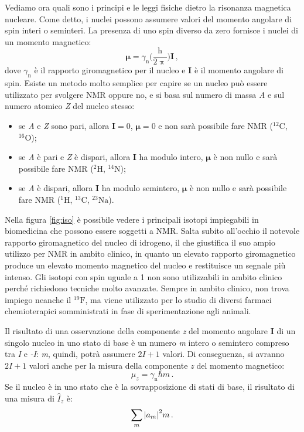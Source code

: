 \documentclass{report}
\newcommand{\figref}[1]{figura \ref{#1}}
\numberwithin{equation}{section}
\numberwithin{figure}{section}
\renewcommand{\Vec}{\bm}
\begin{document}
Vediamo ora quali sono i principi e le leggi fisiche dietro la risonanza magnetica nucleare. Come detto, i nuclei possono assumere valori del momento angolare di spin interi o seminteri. La presenza di uno spin diverso da zero fornisce i nuclei di un momento magnetico:
\begin{equation}
    \Vec{\mu} = \gamma_\mathrm{n} \bigg( \frac{\mathrm{h}}{2\uppi} \bigg) \Vec{I}\,,
\end{equation}
dove $\gamma_\mathrm{n}$ è il rapporto giromagnetico per il nucleo e $\Vec{I}$ è il momento angolare di spin. Esiste un metodo molto semplice per capire se un nucleo può essere utilizzato per svolgere NMR oppure no, e si basa sul numero di massa \textit{A} e sul numero atomico \textit{Z} del nucleo stesso:
\begin{itemize}[label=$-$]
    \item se \textit{A} e \textit{Z} sono pari, allora $\Vec{I}=0$, $\Vec{\mu}=0$ e non sarà possibile fare NMR ($\mathrm{^{12}C}$, $\mathrm{^{16}O}$);
    \item se \textit{A} è pari e \textit{Z} è dispari, allora $\Vec{I}$ ha modulo intero, $\Vec{\mu}$ è non nullo e sarà possibile fare NMR ($\mathrm{^2H}$, $\mathrm{^{14}N}$);
    \item se \textit{A} è dispari, allora $\Vec{I}$ ha modulo semintero, $\Vec{\mu}$ è non nullo e sarà possibile fare NMR ($\mathrm{^1H}$, $\mathrm{^{13}C}$, $\mathrm{^{23}Na}$).
\end{itemize}
Nella \figref{fig:iso} è possibile vedere i principali isotopi impiegabili in biomedicina che possono essere soggetti a NMR. Salta subito all'occhio il notevole rapporto giromagnetico del nucleo di idrogeno, il che giustifica il suo ampio utilizzo  per NMR in ambito clinico, in quanto un elevato rapporto giromagnetico produce un elevato momento magnetico del nucleo e restituisce un segnale più intenso. Gli isotopi con spin uguale a 1 non sono utilizzabili in ambito clinico perché richiedono tecniche molto avanzate. Sempre in ambito clinico, non trova impiego neanche il $\mathrm{^{19}F}$, ma viene utilizzato per lo studio di diversi farmaci chemioterapici somministrati in fase di sperimentazione agli animali.

Il risultato di una osservazione della componente \textit{z} del momento angolare $\Vec{I}$ di un singolo nucleo in uno stato di base è un numero \textit{m} intero o semintero compreso tra \textit{I} e \textit{-I}: \textit{m}, quindi, potrà assumere $2I+1$ valori. Di conseguenza, si avranno $2I+1$ valori anche per la misura della componente \textit{z} del momento magnetico:
\begin{equation}
    \mu_z=\gamma_\mathrm{n} \hbar m\,.
\end{equation}
Se il nucleo è in uno stato che è la sovrapposizione di stati di base, il risultato di una misura di $\hat{I}_z$ è:
\begin{equation}
    \sum_m \abs{a_m}^2 m\,.
    \label{sum}
\end{equation}
\end{document}
